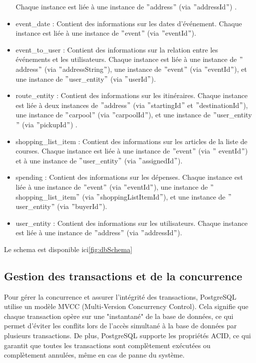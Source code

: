 \begin{itemize}
    Chaque instance est liée à une instance de \("\)address\("\) (via \("\)addressId\("\)) .
    \item event_date : Contient des informations sur les dates d'événement.
    Chaque instance est liée à une instance de \("\)event\("\) (via \("\)eventId\("\)).
    \item event_to_user : Contient des informations sur la relation entre les événements et les utilisateurs.
    Chaque instance est liée à une instance de \("\)address\("\) (via \("\)addressString\("\)), une instance de \("\)event\("\) (via \("\)eventId\("\)), et une instance de \("\)user\_entity\("\) (via \("\)userId\("\)).
    \item route_entity : Contient des informations sur les itinéraires.
    Chaque instance est liée à deux instances de \("\)address\("\) (via \("\)startingId\("\) et \("\)destinationId\("\)), une instance de \("\)carpool\("\) (via \("\)carpoolId\("\)), et une instance de \("\)user\_entity\("\) (via \("\)pickupId\("\)) .
    \item shopping_list_item : Contient des informations sur les articles de la liste de courses.
    Chaque instance est liée à une instance de \("\)event\("\) (via \("\) eventId\("\)) et à une instance de \("\)user\_entity\("\) (via \("\)assignedId\("\)).
    \item spending : Contient des informations sur les dépenses.
    Chaque instance est liée à une instance de \("\)event\("\) (via \("\)eventId\("\)), une instance de \("\)shopping\_list\_item\("\) (via \("\)shoppingListItemId\("\)), et une instance de \("\)user\_entity\("\) (via \("\)buyerId\("\)).
    \item user_entity : Contient des informations sur les utilisateurs.
    Chaque instance est liée à une instance de \("\)address\("\) (via \("\)addressId\("\)).
\end{itemize}

Le schema est disponible ici\ref{fig:dbSchema}%

\subsection{Gestion des transactions et de la concurrence}\label{subsec:transaction-concurrency}
Pour gérer la concurrence et assurer l'intégrité des transactions, PostgreSQL utilise un modèle MVCC (Multi-Version Concurrency Control).
Cela signifie que chaque transaction opère sur une "instantané" de la base de données, ce qui permet d'éviter les conflits lors de l'accès simultané à la base de données par plusieurs transactions.
De plus, PostgreSQL supporte les propriétés ACID, ce qui garantit que toutes les transactions sont complètement exécutées ou complètement annulées, même en cas de panne du système.

